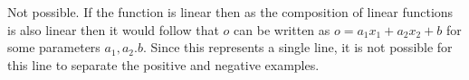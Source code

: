 \begin{answer}
Not possible.
    If the function is linear then as the composition of linear functions is also linear then it would follow that $o$ can be written as
    $o = a_1x_1 + a_2x_2 + b$ for some parameters $a_1,a_2.b.$ Since this represents a single line, it is not possible
    for this line to separate the positive and negative examples.
    
\end{answer}
